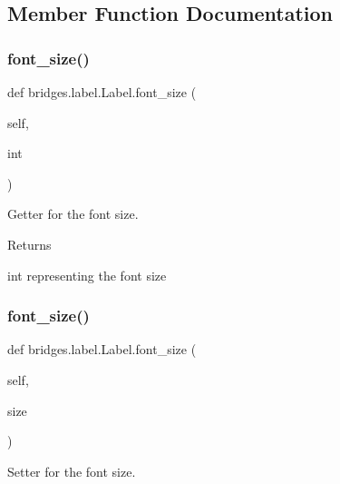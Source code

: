 \subsection{Member Function Documentation}
\mbox{\label{classbridges_1_1label_1_1_label_ae1f120fa56b03e9937357a830bff7cf6}} 
\subsubsection{\texorpdfstring{font\+\_\+size()}{font\_size()}\hspace{0.1cm}{\footnotesize\ttfamily [1/2]}}
{\footnotesize\ttfamily def bridges.\+label.\+Label.\+font\+\_\+size (\begin{DoxyParamCaption}\item[{}]{self,  }\item[{}]{int }\end{DoxyParamCaption})}



Getter for the font size. 

\begin{DoxyReturn}{Returns}


int representing the font size 
\end{DoxyReturn}
\mbox{\label{classbridges_1_1label_1_1_label_a3fc6397d7cfda34ed315545f838f7470}} 
\subsubsection{\texorpdfstring{font\+\_\+size()}{font\_size()}\hspace{0.1cm}{\footnotesize\ttfamily [2/2]}}
{\footnotesize\ttfamily def bridges.\+label.\+Label.\+font\+\_\+size (\begin{DoxyParamCaption}\item[{}]{self,  }\item[{}]{size }\end{DoxyParamCaption})}



Setter for the font size. 


